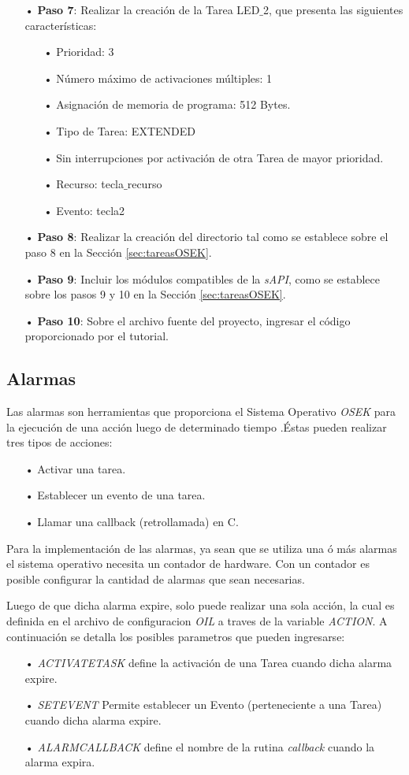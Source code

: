 \documentclass[12pt,letterpaper]{article}
\begin{document}
\begin{enumerate}
\item[•]\textbf{Paso 7}: Realizar la creación de la Tarea LED$\_$2, que presenta las siguientes características:
\begin{enumerate}
\item[•]Prioridad: 3
\item[•]Número máximo de activaciones múltiples: 1
\item[•]Asignación de memoria de programa: 512 Bytes.
\item[•]Tipo de Tarea: EXTENDED
\item[•]Sin interrupciones por activación de otra Tarea de mayor prioridad.
\item[•]Recurso: tecla$\_$recurso
\item[•]Evento: tecla2
\end{enumerate}
\item[•]\textbf{Paso 8}: Realizar la creación del directorio tal como se establece sobre el paso 8 en la Sección \ref{sec:tareasOSEK}.
\item[•]\textbf{Paso 9}: Incluir los módulos compatibles de la \textit{sAPI}, como se establece sobre los pasos 9 y 10 en la Sección \ref{sec:tareasOSEK}.
\item[•]\textbf{Paso 10}: Sobre el archivo fuente del proyecto, ingresar el código proporcionado por el tutorial.

\end{enumerate}

\subsection{Alarmas}
Las alarmas son herramientas que proporciona el Sistema Operativo \textit{OSEK} para la ejecución de una acción luego de determinado tiempo \cite{libroosekcerdeiro}.Éstas pueden realizar tres tipos de acciones:
\begin{enumerate}
\item[•]Activar una tarea.
\item[•]Establecer un evento de una tarea.
\item[•]Llamar una callback (retrollamada) en C.
\end{enumerate}
Para la implementación de las alarmas, ya sean que se utiliza una ó más alarmas el sistema operativo necesita un contador de hardware. Con un contador es posible configurar la cantidad de alarmas que sean necesarias.

Luego de que dicha alarma expire, solo puede realizar una sola acción, la cual es definida en el archivo de configuracion \textit{OIL} a traves de la variable \textit{ACTION}. A continuación se detalla los posibles parametros que pueden ingresarse:
\begin{enumerate}
\item[•]\textit{ACTIVATETASK} define la activación de una Tarea cuando dicha alarma expire.
\item[•]\textit{SETEVENT} Permite establecer un Evento (perteneciente a una Tarea) cuando dicha alarma expire.
\item[•]\textit{ALARMCALLBACK} define el nombre de la rutina \textit{callback} cuando la alarma expira.
\end{enumerate}
\end{document}
